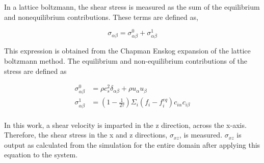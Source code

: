 In a lattice boltzmann, the shear stress is measured as the sum of the equilibrium and nonequilibrium contributions.
\cite{kruger_shear_2009} These terms are defined as,

\begin{equation}
    \sigma_{\alpha \beta} = \sigma_{\alpha \beta}^{0} + \sigma_{\alpha \beta}^{1}
\end{equation}

This expression is obtained from the Chapman Enskog expansion of the lattice boltzmann method. The equilibrium and
non-equilibrium contributions of the stress are defined as

\begin{equation}
    \begin{split}
        \sigma_{\alpha \beta}^{0} &= \rho c_s^2 \delta_{\alpha \beta} + \rho u_{\alpha} u_{\beta} \\
        \sigma_{\alpha \beta}^{1} &= (1 - \frac{1}{2 \tau})\Sigma_{i} (f_{i} - f_{i}^{eq})c_{i \alpha}c_{i \beta} \\
    \end{split}
\end{equation}

In this work, a shear velocity is imparted in the z direction, across the x-axis. Therefore, the shear stress in the x 
and z directions, $\sigma_{xz}$, is measured. $\sigma_{xz}$ is output as calculated from the simulation for the entire 
domain after applying this equation to the system. 




